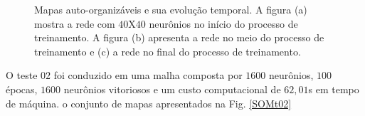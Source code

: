 \begin{figure}[H]
	\centering
	\qquad
	\qquad
	\qquad
	\caption{Mapas auto-organizáveis e sua evolução temporal. A figura (a) mostra a rede com $40$X$40$ neurônios no início do processo de treinamento. A figura (b) apresenta a rede no meio do processo de treinamento e (c) a rede no final do processo de treinamento.}
	\label{SOMt01}
\end{figure}

O teste $02$ foi conduzido em uma malha composta por $1600$ neurônios, $100$ épocas, $1600$ neurônios vitoriosos e um custo computacional de $62,01$s em tempo de máquina. o conjunto de mapas apresentados na Fig. \ref{SOMt02}

